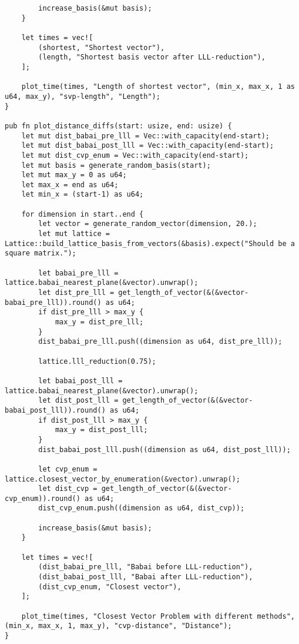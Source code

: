 \begin{verbatim}
        increase_basis(&mut basis);
    }

    let times = vec![
        (shortest, "Shortest vector"),
        (length, "Shortest basis vector after LLL-reduction"),
    ];

    plot_time(times, "Length of shortest vector", (min_x, max_x, 1 as u64, max_y), "svp-length", "Length");
}

pub fn plot_distance_diffs(start: usize, end: usize) {
    let mut dist_babai_pre_lll = Vec::with_capacity(end-start);
    let mut dist_babai_post_lll = Vec::with_capacity(end-start);
    let mut dist_cvp_enum = Vec::with_capacity(end-start);
    let mut basis = generate_random_basis(start);
    let mut max_y = 0 as u64;
    let max_x = end as u64;
    let min_x = (start-1) as u64;

    for dimension in start..end {
        let vector = generate_random_vector(dimension, 20.);
        let mut lattice = Lattice::build_lattice_basis_from_vectors(&basis).expect("Should be a square matrix.");

        let babai_pre_lll = lattice.babai_nearest_plane(&vector).unwrap();
        let dist_pre_lll = get_length_of_vector(&(&vector-babai_pre_lll)).round() as u64;
        if dist_pre_lll > max_y {
            max_y = dist_pre_lll;
        }
        dist_babai_pre_lll.push((dimension as u64, dist_pre_lll));

        lattice.lll_reduction(0.75);

        let babai_post_lll = lattice.babai_nearest_plane(&vector).unwrap();
        let dist_post_lll = get_length_of_vector(&(&vector-babai_post_lll)).round() as u64;
        if dist_post_lll > max_y {
            max_y = dist_post_lll;
        }
        dist_babai_post_lll.push((dimension as u64, dist_post_lll));

        let cvp_enum = lattice.closest_vector_by_enumeration(&vector).unwrap();
        let dist_cvp = get_length_of_vector(&(&vector-cvp_enum)).round() as u64;
        dist_cvp_enum.push((dimension as u64, dist_cvp));

        increase_basis(&mut basis);
    }

    let times = vec![
        (dist_babai_pre_lll, "Babai before LLL-reduction"),
        (dist_babai_post_lll, "Babai after LLL-reduction"),
        (dist_cvp_enum, "Closest vector"),
    ];

    plot_time(times, "Closest Vector Problem with different methods", (min_x, max_x, 1, max_y), "cvp-distance", "Distance");
}



\end{verbatim}
